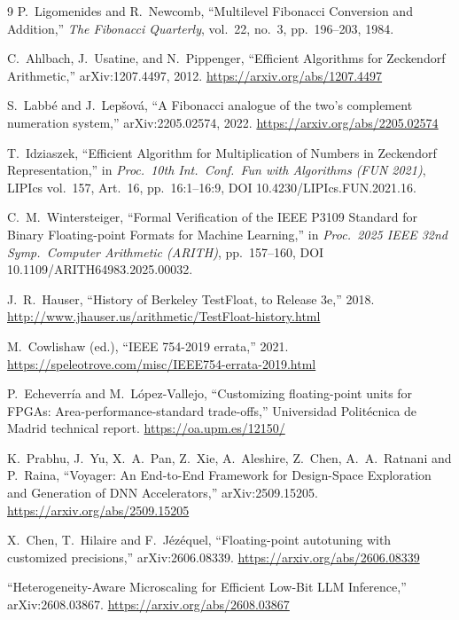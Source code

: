 \documentclass[11pt]{article}
\theoremstyle{definition}
\begin{document}
\begin{thebibliography}{9}
 P.~Ligomenides and R.~Newcomb, ``Multilevel Fibonacci Conversion and Addition,'' \emph{The Fibonacci Quarterly}, vol.~22, no.~3, pp.~196--203, 1984.

 C.~Ahlbach, J.~Usatine, and N.~Pippenger, ``Efficient Algorithms for Zeckendorf Arithmetic,'' arXiv:1207.4497, 2012. \url{https://arxiv.org/abs/1207.4497}

 S.~Labb\'{e} and J.~Lep\v{s}ov\'{a}, ``A Fibonacci analogue of the two's complement numeration system,'' arXiv:2205.02574, 2022. \url{https://arxiv.org/abs/2205.02574}

 T.~Idziaszek, ``Efficient Algorithm for Multiplication of Numbers in Zeckendorf Representation,'' in \emph{Proc.\ 10th Int.\ Conf.\ Fun with Algorithms (FUN 2021)}, LIPIcs vol.~157, Art.\ 16, pp.~16:1--16:9, DOI 10.4230/LIPIcs.FUN.2021.16.

 C.~M.~Wintersteiger, ``Formal Verification of the IEEE P3109 Standard for Binary Floating-point Formats for Machine Learning,'' in \emph{Proc.\ 2025 IEEE 32nd Symp.\ Computer Arithmetic (ARITH)}, pp.~157--160, DOI 10.1109/ARITH64983.2025.00032.

 J.~R.~Hauser, ``History of Berkeley TestFloat, to Release 3e,'' 2018. \url{http://www.jhauser.us/arithmetic/TestFloat-history.html}

 M.~Cowlishaw (ed.), ``IEEE 754-2019 errata,'' 2021. \url{https://speleotrove.com/misc/IEEE754-errata-2019.html}

 P.~Echeverr\'{i}a and M.~L\'{o}pez-Vallejo, ``Customizing floating-point units for FPGAs: Area-performance-standard trade-offs,'' Universidad Polit\'{e}cnica de Madrid technical report. \url{https://oa.upm.es/12150/}

 K.~Prabhu, J.~Yu, X.~A.~Pan, Z.~Xie, A.~Aleshire, Z.~Chen, A.~A.~Ratnani and P.~Raina, ``Voyager: An End-to-End Framework for Design-Space Exploration and Generation of DNN Accelerators,'' arXiv:2509.15205. \url{https://arxiv.org/abs/2509.15205}

 X.~Chen, T.~Hilaire and F.~J\'{e}z\'{e}quel, ``Floating-point autotuning with customized precisions,'' arXiv:2606.08339. \url{https://arxiv.org/abs/2606.08339}

 ``Heterogeneity-Aware Microscaling for Efficient Low-Bit LLM Inference,'' arXiv:2608.03867. \url{https://arxiv.org/abs/2608.03867}


\end{thebibliography}
\end{document}
